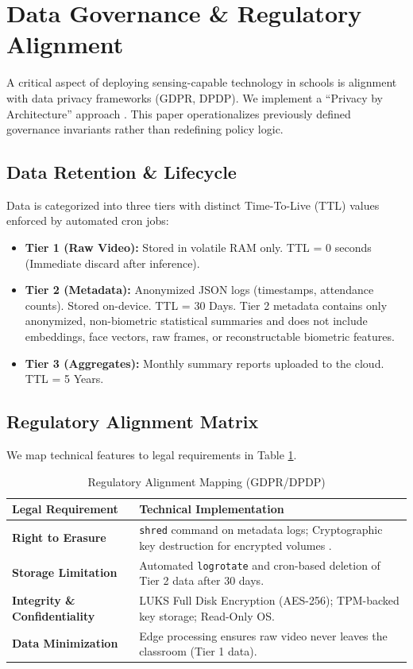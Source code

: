 \documentclass[conference]{IEEEtran}
\begin{document}
\section{Data Governance \& Regulatory Alignment}

A critical aspect of deploying sensing-capable technology in schools is alignment with data privacy frameworks (GDPR, DPDP). We implement a ``Privacy by Architecture'' approach \cite{b9}. This paper operationalizes previously defined governance invariants rather than redefining policy logic. 

\subsection{Data Retention \& Lifecycle}
Data is categorized into three tiers with distinct Time-To-Live (TTL) values enforced by automated cron jobs:
\begin{itemize}
    \item \textbf{Tier 1 (Raw Video):} Stored in volatile RAM only. TTL = 0 seconds (Immediate discard after inference).
    \item \textbf{Tier 2 (Metadata):} Anonymized JSON logs (timestamps, attendance counts). Stored on-device. TTL = 30 Days. Tier 2 metadata contains only anonymized, non-biometric statistical summaries and does not include embeddings, face vectors, raw frames, or reconstructable biometric features.
    \item \textbf{Tier 3 (Aggregates):} Monthly summary reports uploaded to the cloud. TTL = 5 Years.
\end{itemize}

\subsection{Regulatory Alignment Matrix}
We map technical features to legal requirements in Table \ref{tab:compliance}.

\begin{table}[htbp]
\caption{Regulatory Alignment Mapping (GDPR/DPDP)}
\begin{center}
\begin{tabular}{|p{3cm}|p{4.5cm}|}
\hline
\textbf{Legal Requirement} & \textbf{Technical Implementation} \\
\hline
\textbf{Right to Erasure} & \texttt{shred} command on metadata logs; Cryptographic key destruction for encrypted volumes \cite{b29}. \\
\hline
\textbf{Storage Limitation} & Automated \texttt{logrotate} and cron-based deletion of Tier 2 data after 30 days. \\
\hline
\textbf{Integrity \& Confidentiality} & LUKS Full Disk Encryption (AES-256); TPM-backed key storage; Read-Only OS. \\
\hline
\textbf{Data Minimization} & Edge processing ensures raw video never leaves the classroom (Tier 1 data). \\
\hline
\end{tabular}
\end{center}
\label{tab:compliance}
\end{table}
\end{document}
